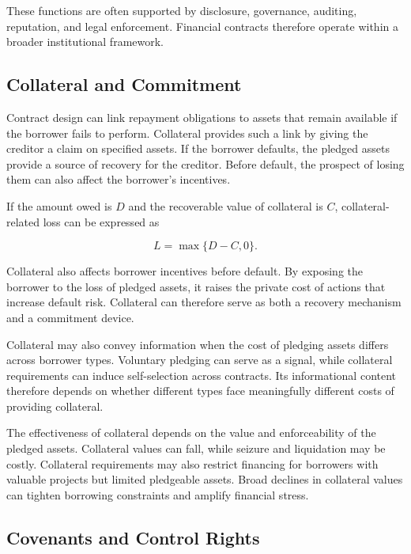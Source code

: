 These functions are often supported by disclosure, governance, auditing, reputation, and legal enforcement. Financial contracts therefore operate within a broader institutional framework.

\subsection{Collateral and Commitment}

Contract design can link repayment obligations to assets that remain available if the borrower fails to perform. Collateral provides such a link by giving the creditor a claim on specified assets. If the borrower defaults, the pledged assets provide a source of recovery for the creditor. Before default, the prospect of losing them can also affect the borrower's incentives.

If the amount owed is $D$  and the recoverable value of collateral is $C$, collateral-related loss can be expressed as

\begin{equation}
L=\max\{D-C,0\}.
\label{eq:ch3-collateral-loss}
\end{equation}

Collateral also affects borrower incentives before default. By exposing the borrower to the loss of pledged assets, it raises the private cost of actions that increase default risk. Collateral can therefore serve as both a recovery mechanism and a commitment device.

Collateral may also convey information when the cost of pledging assets differs across borrower types. Voluntary pledging can serve as a signal, while collateral requirements can induce self-selection across contracts. Its informational content therefore depends on whether different types face meaningfully different costs of providing collateral.

The effectiveness of collateral depends on the value and enforceability of the pledged assets. Collateral values can fall, while seizure and liquidation may be costly. Collateral requirements may also restrict financing for borrowers with valuable projects but limited pledgeable assets. Broad declines in collateral values can tighten borrowing constraints and amplify financial stress.

\subsection{Covenants and Control Rights}

